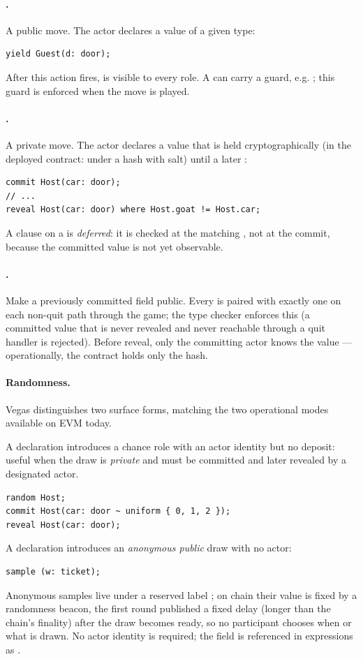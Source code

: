 \paragraph{.}  A public move.  The actor declares a value
of a given type:
\begin{lstlisting}[style=vg]
yield Guest(d: door);
\end{lstlisting}
After this action fires,  is visible to every role.  A
 can carry a  guard, e.g.
; this guard
is enforced when the move is played.

\paragraph{.}  A private move.  The actor declares a
value that is held cryptographically (in the deployed contract:
under a hash with salt) until a later :
\begin{lstlisting}[style=vg]
commit Host(car: door);
// ...
reveal Host(car: door) where Host.goat != Host.car;
\end{lstlisting}
A  clause on a  is \emph{deferred}: it is
checked at the matching , not at the commit, because the
committed value is not yet observable.

\paragraph{.}  Make a previously committed field
public.  Every  is paired with exactly one 
on each non-quit path through the game; the type checker enforces
this (a committed value that is never revealed and never reachable
through a quit handler is rejected).  Before reveal, only the
committing actor knows the value --- operationally, the contract
holds only the hash.

\paragraph{Randomness.}  Vegas distinguishes two surface forms,
matching the two operational modes available on EVM today.

A  declaration introduces a chance role with an actor
identity but no deposit: useful when the draw is \emph{private}
and must be committed and later revealed by a designated actor.
\begin{lstlisting}[style=vg]
random Host;
commit Host(car: door ~ uniform { 0, 1, 2 });
reveal Host(car: door);
\end{lstlisting}
A  declaration introduces an \emph{anonymous public}
draw with no actor:
\begin{lstlisting}[style=vg]
sample (w: ticket);
\end{lstlisting}
Anonymous samples live under a reserved label ; on chain
their value is fixed by a randomness beacon, the first round published
a fixed delay (longer than the chain's finality) after the draw becomes
ready, so no participant chooses when or what is drawn.  No actor identity is required; the field is
referenced in expressions as .

